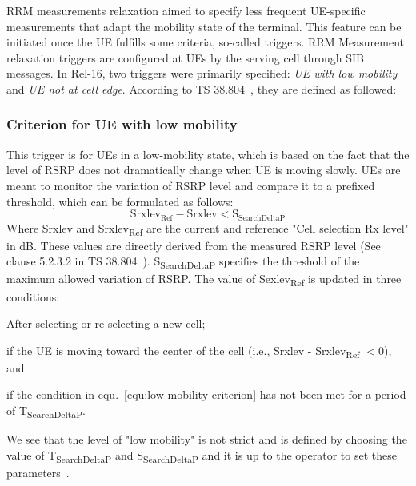 \documentclass[]{IEEEtran}
\begin{document}
 RRM measurements relaxation aimed to specify less frequent UE-specific measurements that adapt the mobility state of the terminal. 
 This feature can be initiated once the UE fulfills some criteria, so-called triggers. 
 RRM Measurement relaxation triggers are configured at UEs by the serving cell through SIB messages. 
 In Rel-16, two triggers were primarily specified: \textit{UE with low mobility} and \textit{UE not at cell edge}. According to TS 38.804~\cite{3gpp_study_nodate-4_38.804}, they are defined as followed:

\subsubsection*{\textbf{Criterion for UE with low mobility}}
This trigger is for UEs in a low-mobility state, which is based on the fact that the level of RSRP does not dramatically change when UE is moving slowly. 
UEs are meant to monitor the variation of RSRP level and compare it to a prefixed threshold, which can be formulated as follows:
\begin{equation}
\textrm{Srxlev}_{\textrm{Ref}}-\textrm{Srxlev}<\textrm{S}_{\textrm{SearchDeltaP}}
\label{equ:low-mobility-criterion}
\end{equation}
Where Srxlev and Srxlev\textsubscript{Ref} are the current and reference "Cell selection Rx level" in dB.
These values are directly derived from the measured RSRP level (See clause 5.2.3.2 in TS 38.804~\cite{3gpp_nr_2022-10_38.304}).
S\textsubscript{SearchDeltaP} specifies the threshold of the maximum allowed variation of RSRP. 
The value of Sexlev\textsubscript{Ref} is updated in three conditions:
\begin{enumerate*}
    \item After selecting or re-selecting a new cell;
    \item if the UE is moving toward the center of the cell (i.e., Srxlev - Srxlev\textsubscript{Ref} $<0$), and
    \item if the condition in equ.~\ref{equ:low-mobility-criterion} has not been met for a period of T\textsubscript{SearchDeltaP}.
\end{enumerate*}
We see that the level of "low mobility" is not strict and is defined by choosing the value of T\textsubscript{SearchDeltaP} and  S\textsubscript{SearchDeltaP} and it is up to the operator to set these parameters~\cite{veedu_toward_2022_arXiv:2203.05634}.\\
\end{document}
